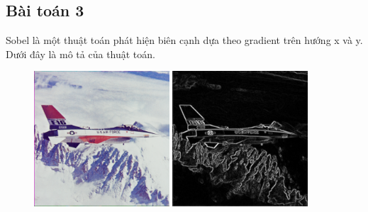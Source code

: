 \documentclass{article}
\begin{document}
\subsection{Bài toán 3}
Sobel là một thuật toán phát hiện biên cạnh dựa theo gradient trên hướng x và y. Dưới đây là mô tả của thuật toán.

\begin{figure}
    \centering
    \includegraphics[width=0.45\textwidth]{airplane_raw.png}
    \includegraphics[width=0.45\textwidth]{airplane.png}
\end{figure}
\end{document}
